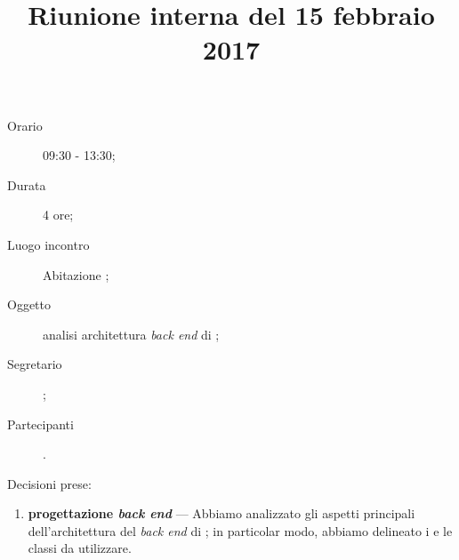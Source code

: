


\author{\LS}
\supervisor{\LB}
\dest{\ALL}
\title{Riunione interna del 15 febbraio 2017}



\maketitle

\begin{description}
	\item[Orario] 09:30 - 13:30;
	\item[Durata] 4 ore;
	\item[Luogo incontro] Abitazione \GG;
	\item[Oggetto] analisi architettura \emph{back end} di \proj;
	\item[Segretario] \LS;
	\item[Partecipanti] \ALL.
\end{description}

Decisioni prese:
\begin{enumerate}
	\item \textbf{progettazione \emph{back end}} --- Abbiamo analizzato gli aspetti principali dell'architettura del \emph{back end} di \proj; in particolar modo, abbiamo delineato i  e le classi da utilizzare.
\end{enumerate}


